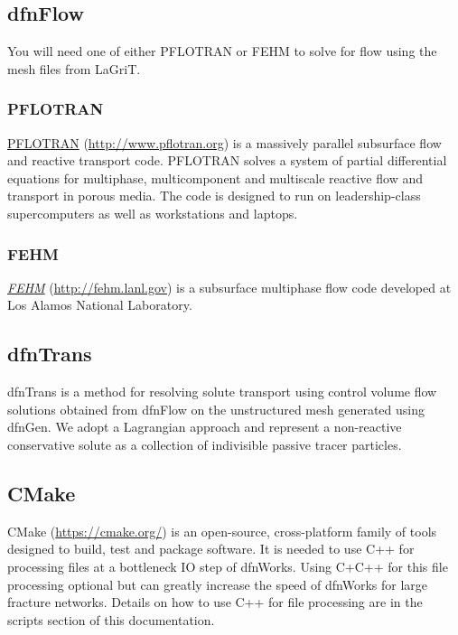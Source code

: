 \documentclass[letterpaper,10pt,english]{sphinxmanual}
\begin{document}
\subsection{dfnFlow}
\label{intro:dfnflow}
You will need one of either PFLOTRAN or FEHM to solve for flow using the mesh files from LaGriT.


\subsubsection{PFLOTRAN}
\label{intro:pflotran}
\href{https://www.pflotran.org/}{PFLOTRAN} (\href{http://www.pflotran.org}{http://www.pflotran.org}) is a massively parallel subsurface flow and reactive transport code. PFLOTRAN solves a system of partial differential equations for multiphase, multicomponent and multiscale reactive flow and transport in porous media. The code is designed to run on leadership-class supercomputers as well as workstations and laptops.


\subsubsection{FEHM}
\label{intro:fehm}\label{intro:id1}
{\hyperref[intro:fehm]{\emph{FEHM}}} (\href{http://fehm.lanl.gov}{http://fehm.lanl.gov}) is a subsurface multiphase flow code developed at Los Alamos National Laboratory.


\subsection{dfnTrans}
\label{intro:dfntrans}
dfnTrans is a method for resolving solute transport using control volume flow solutions obtained from dfnFlow on the unstructured mesh generated using dfnGen. We adopt a Lagrangian approach and represent a non-reactive conservative solute as a collection of indivisible passive tracer particles.


\subsection{CMake}
\label{intro:cmake}
CMake (\href{https://cmake.org/}{https://cmake.org/}) is an open-source, cross-platform family of tools designed to build, test and package software. It is needed to use C++ for processing files at a bottleneck IO step of dfnWorks. Using C+C++ for this file processing optional but can greatly increase the speed of dfnWorks for large fracture networks. Details on how to use C++ for file processing are in the scripts section of this documentation.
\end{document}
